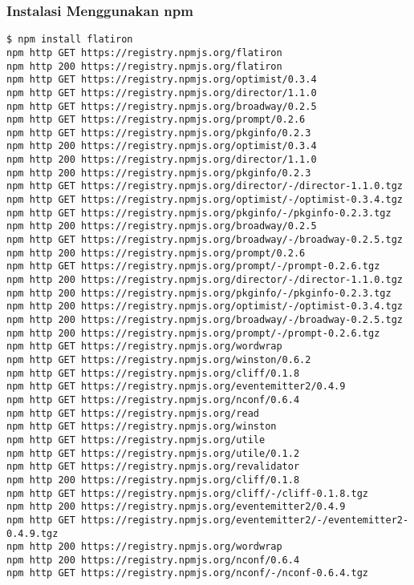 \subsubsection{Instalasi Menggunakan npm}
\lstset{language=bash,caption=Proses instalasi Flatiron}
\begin{lstlisting}
$ npm install flatiron
npm http GET https://registry.npmjs.org/flatiron
npm http 200 https://registry.npmjs.org/flatiron
npm http GET https://registry.npmjs.org/optimist/0.3.4
npm http GET https://registry.npmjs.org/director/1.1.0
npm http GET https://registry.npmjs.org/broadway/0.2.5
npm http GET https://registry.npmjs.org/prompt/0.2.6
npm http GET https://registry.npmjs.org/pkginfo/0.2.3
npm http 200 https://registry.npmjs.org/optimist/0.3.4
npm http 200 https://registry.npmjs.org/director/1.1.0
npm http 200 https://registry.npmjs.org/pkginfo/0.2.3
npm http GET https://registry.npmjs.org/director/-/director-1.1.0.tgz
npm http GET https://registry.npmjs.org/optimist/-/optimist-0.3.4.tgz
npm http GET https://registry.npmjs.org/pkginfo/-/pkginfo-0.2.3.tgz
npm http 200 https://registry.npmjs.org/broadway/0.2.5
npm http GET https://registry.npmjs.org/broadway/-/broadway-0.2.5.tgz
npm http 200 https://registry.npmjs.org/prompt/0.2.6
npm http GET https://registry.npmjs.org/prompt/-/prompt-0.2.6.tgz
npm http 200 https://registry.npmjs.org/director/-/director-1.1.0.tgz
npm http 200 https://registry.npmjs.org/pkginfo/-/pkginfo-0.2.3.tgz
npm http 200 https://registry.npmjs.org/optimist/-/optimist-0.3.4.tgz
npm http 200 https://registry.npmjs.org/broadway/-/broadway-0.2.5.tgz
npm http 200 https://registry.npmjs.org/prompt/-/prompt-0.2.6.tgz
npm http GET https://registry.npmjs.org/wordwrap
npm http GET https://registry.npmjs.org/winston/0.6.2
npm http GET https://registry.npmjs.org/cliff/0.1.8
npm http GET https://registry.npmjs.org/eventemitter2/0.4.9
npm http GET https://registry.npmjs.org/nconf/0.6.4
npm http GET https://registry.npmjs.org/read
npm http GET https://registry.npmjs.org/winston
npm http GET https://registry.npmjs.org/utile
npm http GET https://registry.npmjs.org/utile/0.1.2
npm http GET https://registry.npmjs.org/revalidator
npm http 200 https://registry.npmjs.org/cliff/0.1.8
npm http GET https://registry.npmjs.org/cliff/-/cliff-0.1.8.tgz
npm http 200 https://registry.npmjs.org/eventemitter2/0.4.9
npm http GET https://registry.npmjs.org/eventemitter2/-/eventemitter2-0.4.9.tgz
npm http 200 https://registry.npmjs.org/wordwrap
npm http 200 https://registry.npmjs.org/nconf/0.6.4
npm http GET https://registry.npmjs.org/nconf/-/nconf-0.6.4.tgz

\end{lstlisting}
